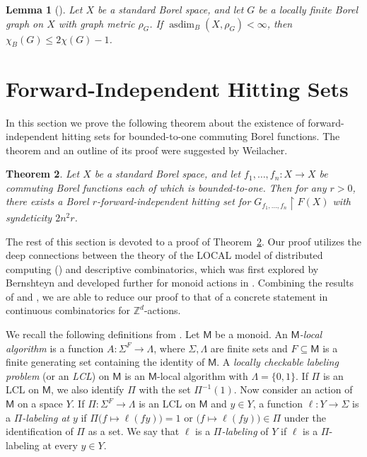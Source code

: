 \documentclass[11pt, reqno, a4paper]{amsart}
\newtheorem{theorem}{Theorem}[section]
\newtheorem{lemma}[theorem]{Lemma}
\theoremstyle{definition}
\theoremstyle{plain}
\begin{document}
\begin{lemma}[{\cite[Corollary 8.2]{ConleyJacksonMarksSewardTuckerDrob2023}}] \label{lem:color}
Let $X$ be a standard Borel space, and let $G$ be a locally finite Borel
graph on $X$ with graph metric $\rho_G$. If
$\operatorname{asdim}_B(X,\rho_G)<\infty$,
then
$\chi_B(G)\le 2\chi(G)-1$.
\end{lemma}


\section{Forward-Independent Hitting Sets}
In this section we prove the following theorem about the existence of forward-independent hitting sets for bounded-to-one commuting Borel functions. The theorem and an outline of its proof were suggested by Weilacher.

\begin{theorem} \label{thm:Weilacher} Let $X$ be a standard Borel space, and let $f_1, \dots, f_n\colon X\to X$ be commuting Borel functions each of which is bounded-to-one. Then for any $r>0$, there exists a Borel $r$-forward-independent hitting set for $G_{f_1,\dots, f_n}\upharpoonright F(X)$ with syndeticity $2n^2r$.
\end{theorem}

The rest of this section is devoted to a proof of Theorem~\ref{thm:Weilacher}. Our proof utilizes the deep connections between the theory of the LOCAL model of distributed computing (\cite{Lin92}) and descriptive combinatorics, which was first explored by Bernshteyn \cite{Ber23} and developed further for monoid actions in \cite{NaryshkinShinkoWeilacherYuCommutingFunctions}. Combining the results of \cite{Ber23} and \cite{NaryshkinShinkoWeilacherYuCommutingFunctions}, we are able to reduce our proof to that of a concrete statement in continuous combinatorics for $\mathbb{Z}^d$-actions.

We recall the following definitions from \cite{NaryshkinShinkoWeilacherYuCommutingFunctions}. Let $\mathsf{M}$ be a monoid. An \emph{$\mathsf{M}$-local algorithm} is a function $A\colon \Sigma^F\to \Lambda$, where $\Sigma, \Lambda$ are finite sets and $F\subseteq \mathsf{M}$ is a finite generating set containing the identity of $\mathsf{M}$. A \emph{locally checkable labeling problem} (or an \emph{LCL}) on $\mathsf{M}$ is an $\mathsf{M}$-local algorithm with $\Lambda=\{0,1\}$. If $\Pi$ is an LCL on $\mathsf{M}$, we also identify $\Pi$ with the set $\Pi^{-1}(1)$. Now consider an action of $\mathsf{M}$ on a space $Y$. If $\Pi\colon \Sigma^F\to \Lambda$ is an LCL on $\mathsf{M}$ and $y\in Y$, a function $\ell\colon Y\to \Sigma$ is a \emph{$\Pi$-labeling at} $y$ if $\Pi\big(f\mapsto \ell(fy)\big)=1$ or $\big(f\mapsto \ell(fy)\big)\in \Pi$ under the identification of $\Pi$ as a set. We say that $\ell$ is a \emph{$\Pi$-labeling} of $Y$ if $\ell$ is a $\Pi$-labeling at every $y\in Y$. 
\end{document}
